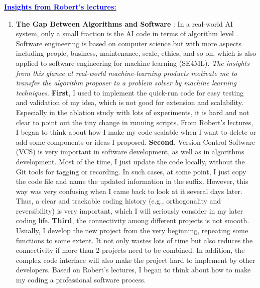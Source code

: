 \documentclass[11pt]{article}
\newcommand{\statement}[1]{\par\medskip
  \underline{\textcolor{blue}{\textbf{#1:}}}\space
}
\begin{document}
\statement{Insights from Robert's lectures} 

\begin{enumerate}
  \item \textbf{The Gap Between Algorithms and Software }: In a real-world AI system, only a small fraction is the AI code in terms of algorithm level \cite{sculley2015hidden}. Software engineering is based on computer science but with more aspects including people, business, maintenance, scale, ethics, and so on, which is also applied to software engineering for machine learning (SE4ML). \emph{The insights from this glance at real-world machine-learning products motivate me to transfer the algorithm proposer to a problem solver by machine learning techniques}. \textbf{First}, I used to implement the quick-run code for easy testing and validation of my idea, which is not good for extension and scalability. Especially in the ablation study with lots of experiments, it is hard and not clear to point out the tiny change in running scripts. From Robert's lectures, I began to think about how I make my code scalable when I want to delete or add some components or ideas I proposed. \textbf{Second}, Version Control Software (VCS) is very important in software development, as well as in algorithms development. Most of the time, I just update the code locally, without the Git tools for tagging or recording. In such cases, at some point, I just copy the code file and name the updated information in the suffix. However, this way was very confusing when I came back to look at it several days later. Thus, a clear and trackable coding history (e.g., orthogonality and reversibility) is very important, which I will seriously consider in my later coding life. \textbf{Third}, the connectivity among different projects is not smooth. Usually, I develop the new project from the very beginning, repeating some functions to some extent. It not only wastes lots of time but also reduces the connectivity if more than 2 projects need to be combined. In addition, the complex code interface will also make the project hard to implement by other developers. Based on Robert's lectures, I began to think about how to make my coding a professional software process.


\end{enumerate}
\end{document}
